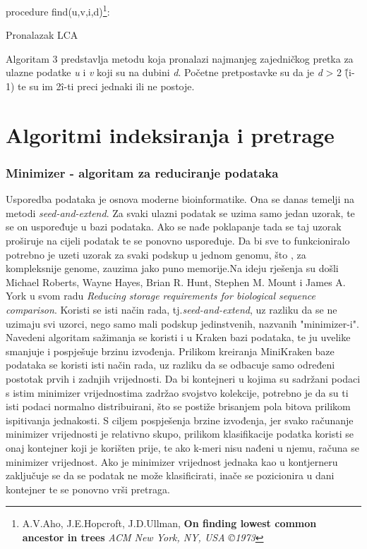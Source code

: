 \documentclass[times, utf8, zavrsni]{fer}
\begin{document}
{\begin{algorithm}[H]
		procedure find(u,v,i,d)\footnote[2]{A.V.Aho, J.E.Hopcroft, J.D.Ullman, \textbf{On finding lowest common ancestor in trees} \textit{ACM New York, NY, USA ©1973}}:\\
	\caption{Pronalazak LCA}
	\label{LCA algorithm 2}
	
\end{algorithm}

Algoritam 3 predstavlja metodu koja pronalazi najmanjeg zajedničkog pretka za ulazne podatke \textit{u} i \textit{v} koji su na dubini \textit{d}. Početne pretpostavke su da je \textit{d} > 2 \^(i-1) te su im 2\^i-ti preci jednaki ili ne postoje.

\chapter{Algoritmi indeksiranja i pretrage}
\subsection{Minimizer - algoritam za reduciranje podataka}
Usporedba podataka je osnova moderne bioinformatike. Ona se danas temelji na metodi \textit{seed-and-extend}. Za svaki ulazni podatak se uzima samo jedan uzorak, te se on uspoređuje u bazi podataka. Ako se nađe poklapanje tada se taj uzorak proširuje na cijeli podatak te se ponovno uspoređuje. Da bi sve to funkcioniralo potrebno je uzeti uzorak za svaki podskup u jednom genomu, što , za kompleksnije genome, zauzima jako puno memorije.Na ideju rješenja su došli Michael Roberts, Wayne Hayes, Brian R. Hunt, Stephen M. Mount i James A. York u svom radu \textit{Reducing storage requirements for biological sequence comparison}. Koristi se isti način rada, tj.\textit{seed-and-extend}, uz razliku da se ne uzimaju svi uzorci, nego samo mali podskup jedinstvenih, nazvanih "minimizer-i".
\\ Navedeni algoritam sažimanja se koristi i u Kraken bazi podataka, te ju uvelike smanjuje i pospješuje brzinu izvođenja. Prilikom kreiranja MiniKraken baze podataka se koristi isti način rada, uz razliku da se odbacuje samo određeni postotak prvih i zadnjih vrijednosti. Da bi kontejneri u kojima su sadržani podaci s istim minimizer vrijednostima zadržao svojstvo kolekcije, potrebno je da su ti isti podaci normalno distribuirani, što se postiže brisanjem pola bitova prilikom ispitivanja jednakosti. S ciljem pospješenja brzine izvođenja, jer svako računanje minimizer vrijednosti je relativno skupo, prilikom klasifikacije podatka koristi se onaj kontejner koji je korišten prije, te ako k-meri nisu nađeni u njemu, računa se minimizer vrijednost. Ako je minimizer vrijednost jednaka kao u kontjerneru zaključuje se da se podatak ne može klasificirati, inače se pozicionira u dani kontejner te se ponovno vrši pretraga.

}
\end{document}
